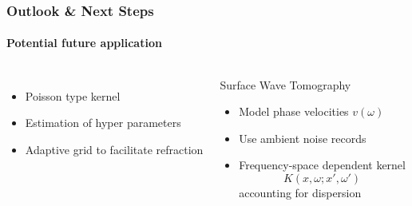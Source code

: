 \documentclass[aspectratio=169, t, 10pt,
    ]{beamer}
\begin{document}
\begin{frame}
    \frametitle{Outlook \& Next Steps }
    \framesubtitle{Potential future application}

\begin{columns}
%

    \begin{itemize}
        \item Poisson type kernel
        \item Estimation of hyper parameters
        \item Adaptive grid to facilitate refraction
    \end{itemize}

    \begin{block}{Surface Wave Tomography}
        \begin{itemize}
            \item Model phase velocities $v(\omega)$
            \item Use ambient noise records
            \item Frequency-space dependent kernel
                \begin{equation}
                    K(x,\omega; x', \omega')
                \end{equation}
                accounting for dispersion
        \end{itemize}
    \end{block}


\end{columns}
\end{frame}
\end{document}
